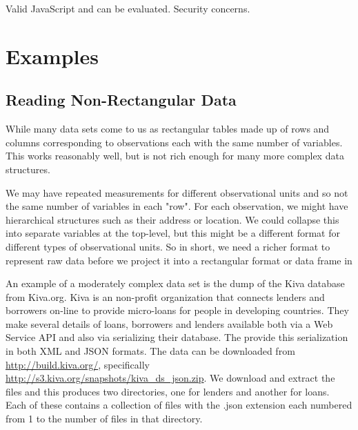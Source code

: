 \documentclass[article]{jss}
\def\hyperlabel#1{}
\begin{document}
Valid JavaScript and can be evaluated. Security concerns.

\section{Examples}
\label{sec:examples}\hyperlabel{sec:examples}%

\subsection{Reading Non-Rectangular Data}

While many data sets come to us as rectangular
tables made up of rows and columns
corresponding to observations 
each with the same number of variables.
This works reasonably well, but is not rich
enough for many more complex data structures.

We may have repeated measurements for different
observational units and so not the same number of 
variables in each "row". 
For each observation, we might have hierarchical
structures such as their address or
location. We could collapse this into separate
variables at the top-level, but this
might be a different format for different types of
observational units. 
So in short, we need a richer format to represent
raw data before we project it into a rectangular
format or data frame in 			

An example of a moderately complex data set 
is the dump of the Kiva database from
Kiva.org. Kiva is an non-profit organization 
that connects lenders and borrowers on-line 
to provide micro-loans for people in developing countries.
They make several details of loans, borrowers and lenders
available both via a Web Service API and also 
via serializing their database. The provide this serialization
in both XML and JSON formats. 
The data can be downloaded from
\url{http://build.kiva.org/},
specifically \url{http://s3.kiva.org/snapshots/kiva_ds_json.zip}.
We download and extract the files and this produces
two directories, one for lenders and another for loans.
Each of these contains a collection of files with the .json extension
each numbered from 1 to the number of files in that directory.
\end{document}
